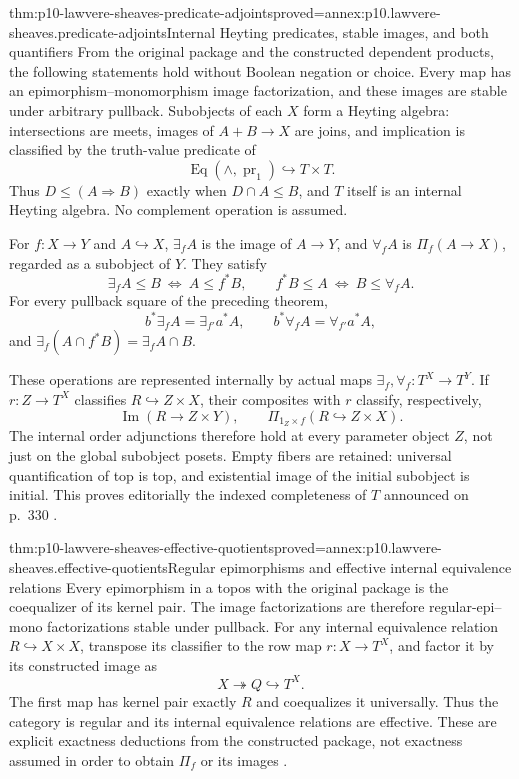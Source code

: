 \begin{hbtheorem}{thm:p10-lawvere-sheaves-predicate-adjoints}{proved=annex:p10.lawvere-sheaves.predicate-adjoints}{Internal Heyting predicates, stable images, and both quantifiers}
From the original package and the constructed dependent products,
the following statements hold without Boolean negation or choice.
Every map has an epimorphism--monomorphism image factorization,
and these images are stable under arbitrary pullback.  Subobjects
of each \(X\) form a Heyting algebra: intersections are meets,
images of \(A+B\to X\) are joins, and implication is classified
by the truth-value predicate of
\[
       \operatorname{Eq}(\land,\operatorname{pr}_1)
                                        \hookrightarrow T\times T.
\]
Thus \(D\leq(A\Rightarrow B)\) exactly when
\(D\cap A\leq B\), and \(T\) itself is an internal
Heyting algebra.  No complement operation is assumed.

For \(f:X\to Y\) and \(A\hookrightarrow X\),
\(\exists_fA\) is the image of \(A\to Y\), and
\(\forall_fA\) is \(\Pi_f(A\to X)\), regarded as a
subobject of \(Y\).  They satisfy
\[
 \exists_fA\leq B\ \Longleftrightarrow\ A\leq f^*B,
 \qquad f^*B\leq A\ \Longleftrightarrow\ B\leq\forall_fA.
\]
For every pullback square of the preceding theorem,
\[
 b^*\exists_fA=\exists_{f'}a^*A,\qquad
 b^*\forall_fA=\forall_{f'}a^*A,
\]
and \(\exists_f(A\cap f^*B)=\exists_fA\cap B\).

These operations are represented internally by actual maps
\(\exists_f,\forall_f:T^X\to T^Y\).  If
\(r:Z\to T^X\) classifies \(R\hookrightarrow Z\times X\),
their composites with \(r\) classify, respectively,
\[
 \operatorname{Im}(R\to Z\times Y),\qquad
 \Pi_{1_Z\times f}(R\hookrightarrow Z\times X).
\]
The internal order adjunctions therefore hold at every parameter
object \(Z\), not just on the global subobject posets.  Empty
fibers are retained: universal quantification of top is top,
and existential image of the initial subobject is initial.
This proves editorially the indexed completeness of \(T\)
announced on p.~330 \cite[p.~330]{Lawvere1970}.
\end{hbtheorem}

\begin{hbtheorem}{thm:p10-lawvere-sheaves-effective-quotients}{proved=annex:p10.lawvere-sheaves.effective-quotients}{Regular epimorphisms and effective internal equivalence relations}
Every epimorphism in a topos with the original package is the
coequalizer of its kernel pair.  The image factorizations are
therefore regular-epi--mono factorizations stable under pullback.
For any internal equivalence relation
\(R\hookrightarrow X\times X\), transpose its classifier
to the row map \(r:X\to T^X\), and factor it by its
constructed image as
\[
                       X\twoheadrightarrow Q\hookrightarrow T^X.
\]
The first map has kernel pair exactly \(R\) and coequalizes
it universally.  Thus the category is regular and its internal
equivalence relations are effective.  These are explicit exactness
deductions from the constructed package, not exactness assumed in
order to obtain \(\Pi_f\) or its images
\cite[p.~330]{Lawvere1970}.
\end{hbtheorem}

